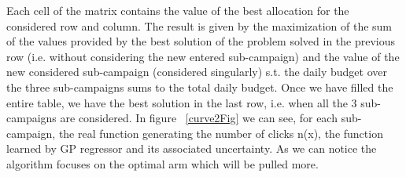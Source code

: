 Each cell of the matrix contains the value of the best allocation for the considered row and column.
The result is given by the maximization of the sum of the values provided by the best solution of the problem solved in the previous row (i.e. without considering the new entered sub-campaign) and
the value of the new considered sub-campaign (considered singularly) s.t. the daily budget over the three sub-campaigns sums to the total daily budget.
Once we have filled the entire table, we have the best solution in the last row, i.e. when all the 3 sub-campaigns are considered.
In figure ~\ref{curve2Fig} we can see, for each sub-campaign, the real function generating the number of clicks n(x), the function learned by GP regressor and its associated uncertainty. As we can notice the algorithm focuses on the optimal arm which will be pulled more.
\begin{figure}[!htb]
    \centering


\end{figure}
